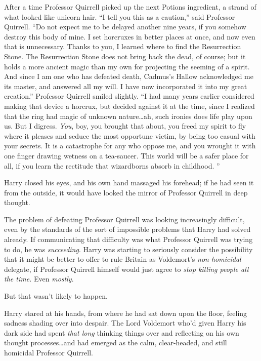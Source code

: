 After a time Professor Quirrell picked up the next Potions ingredient, a strand of what looked like unicorn hair. “I tell you this as a caution,” said Professor Quirrell. “Do not expect me to be delayed another nine years, if you somehow destroy this body of mine. I set horcruxes in better places at once, and now even that is unnecessary. Thanks to you, I learned where to find the Resurrection Stone. The Resurrection Stone does not bring back the dead, of course; but it holds a more ancient magic than my own for projecting the seeming of a spirit. And since I am one who has defeated death, Cadmus’s Hallow acknowledged me its master, and answered all my will. I have now incorporated it into my great creation.” Professor Quirrell smiled slightly. “I had many years earlier considered making that device a horcrux, but decided against it at the time, since I realized that the ring had magic of unknown nature…ah, such ironies does life play upon us. But I digress. \emph{You}, boy, you brought that about, you freed my spirit to fly where it pleases and seduce the most opportune victim, by being too casual with your secrets. It is a catastrophe for any who oppose me, and you wrought it with one finger drawing wetness on a tea-saucer. This world will be a safer place for all, if you learn the rectitude that wizardborns absorb in childhood. ”

Harry closed his eyes, and his own hand massaged his forehead; if he had seen it from the outside, it would have looked the mirror of Professor Quirrell in deep thought.

The problem of defeating Professor Quirrell was looking increasingly difficult, even by the standards of the sort of impossible problems that Harry had solved already. If communicating that difficulty was what Professor Quirrell was trying to do, he was \emph{succeeding}. Harry was starting to seriously consider the possibility that it might be better to offer to rule Britain as Voldemort’s \emph{non-homicidal} delegate, if Professor Quirrell himself would just agree to \emph{stop killing people all the time.} Even \emph{mostly}.

But that wasn’t likely to happen.

Harry stared at his hands, from where he had sat down upon the floor, feeling sadness shading over into despair. The Lord Voldemort who’d given Harry his dark side had spent \emph{that long} thinking things over and reflecting on his own thought processes…and had emerged as the calm, clear-headed, and still homicidal Professor Quirrell.

